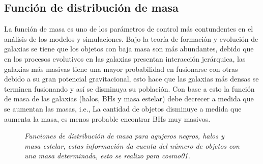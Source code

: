     \subsection{ Función de distribución de masa}
    \label{subsec: funcion de masa}
La función de masa es uno de los parámetros de control más contundentes en el análisis de los modelos y simulaciones. Bajo la teoría de formación y evolución de galaxias se tiene que los objetos con baja masa son más abundantes, debido que en los procesos evolutivos en las galaxias presentan interacción jerárquica, las galaxias más masivas tiene una mayor probabilidad en fusionarse con otras debido a su gran potencial gravitacional, esto hace que las galaxias más densas se terminen fusionando y así se disminuya su población. Con base a esto la función de masa de las galaxias (halos, BHs y masa estelar) debe decrecer a medida que se aumentan las masas, i.e., La cantidad de objetos disminuye a medida que aumenta la masa, es menos probable encontrar BHs muy masivos.
%
\begin{figure}
\centering
{}
\caption{\emph{Funciones de distribución de masa para agujeros negros, halos y masa estelar, estas información da cuenta del número de objetos con una masa determinada, esto se realizo para {\it{cosmo01}}. }}
 \label{fig: Funciones de masa cosmo01}
\end{figure}
